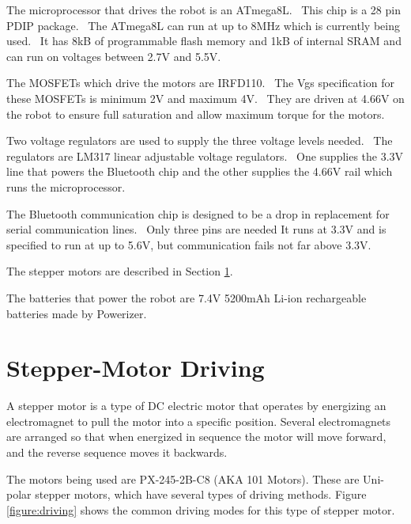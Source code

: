 The microprocessor that drives the robot is an ATmega8L.  This chip is a 28 pin PDIP package.  The ATmega8L can run at up to 8MHz which is currently being used.  It has 8kB of programmable flash memory and 1kB of internal SRAM and can run on voltages between 2.7V and 5.5V.

The MOSFETs which drive the motors are IRFD110.  The Vgs specification for these MOSFETs is minimum 2V and maximum 4V.  They are driven at 4.66V on the robot to ensure full saturation and allow maximum torque for the motors.

Two voltage regulators are used to supply the three voltage levels needed.  The regulators are LM317 linear adjustable voltage regulators.  One supplies the 3.3V line that powers the Bluetooth chip and the other supplies the 4.66V rail which runs the microprocessor.

The Bluetooth communication chip is designed to be a drop in replacement for serial communication lines.  Only three pins are needed It runs at 3.3V and is specified to run at up to 5.6V, but communication fails not far above 3.3V.

The stepper motors are described in Section \ref{section:stepper}.

The batteries that power the robot are 7.4V 5200mAh Li-ion rechargeable batteries made by Powerizer.

\section{Stepper-Motor Driving}
\label{section:stepper}

A stepper motor is a type of DC electric motor that operates by energizing an electromagnet to pull the motor into a specific position.  Several electromagnets are arranged so that when energized in sequence the motor will move forward, and the reverse sequence moves it backwards.

The motors being used are PX-245-2B-C8 (AKA 101 Motors).  These are Uni-polar stepper motors, which have several types of driving methods.  Figure \ref{figure:driving} shows the common driving modes for this type of stepper motor.

